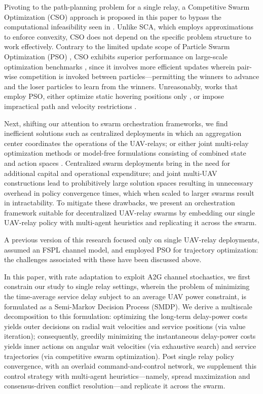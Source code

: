 \documentclass[10pt,twocolumn]{IEEEtran}
\begin{document}
Pivoting to the path-planning problem for a single relay, a Competitive Swarm Optimization (CSO) \cite{CSO} approach is proposed in this paper to bypass the computational infeasibility seen in \cite{SCA, PAoI, Rician}. Unlike SCA, which employs approximations to enforce convexity, CSO does not depend on the specific problem structure to work effectively. Contrary to the limited update scope of Particle Swarm Optimization (PSO) \cite{PSO}, CSO exhibits superior performance on large-scale optimization benchmarks \cite{CSO}, since it involves more efficient updates wherein pair-wise competition is invoked between particles---permitting the winners to advance and the loser particles to learn from the winners. Unreasonably, works that employ PSO, either optimize static hovering positions only \cite{Efficient3DPlacementPSO}, or impose impractical path and velocity restrictions \cite{PSOPathStructure, PAoI}.

Next, shifting our attention to swarm orchestration frameworks, we find inefficient solutions such as centralized deployments \cite{MultiDroneDeployment, CSCA-ADMM} in which an aggregation center coordinates the operations of the UAV-relays; or either joint multi-relay optimization methods \cite{CSCA-ADMM, UAVDynamicCoverage} or model-free formulations consisting of combined state and action spaces \cite{DDQN, MEC-DDPG}. Centralized swarm deployments bring in the need for additional capital and operational expenditure; and joint multi-UAV constructions lead to prohibitively large solution spaces resulting in unnecessary overhead in policy convergence times, which when scaled to larger swarms result in intractability. To mitigate these drawbacks, we present an orchestration framework suitable for decentralized UAV-relay swarms by embedding our single UAV-relay policy with multi-agent heuristics and replicating it across the swarm.

A previous version of this research \cite{ICC} focused only on single UAV-relay deployments, assumed an FSPL channel model, and employed PSO for trajectory optimization: the challenges associated with these have been discussed above.

 In this paper, with rate adaptation to exploit A2G channel stochastics, we first constrain our study to single relay settings, wherein the problem of minimizing the time-average service delay subject to an average UAV power constraint, is formulated as a Semi-Markov Decision Process (SMDP). We derive a multiscale decomposition to this formulation: optimizing the long-term delay-power costs yields outer decisions on radial wait velocities and service positions (via value iteration); consequently, greedily minimizing the instantaneous delay-power costs yields inner actions on angular wait velocities (via exhaustive search) and service trajectories (via competitive swarm optimization). Post single relay policy convergence, with an overlaid command-and-control network, we supplement this control strategy with multi-agent heuristics---namely, spread maximization and consensus-driven conflict resolution---and replicate it across the swarm.
\end{document}
